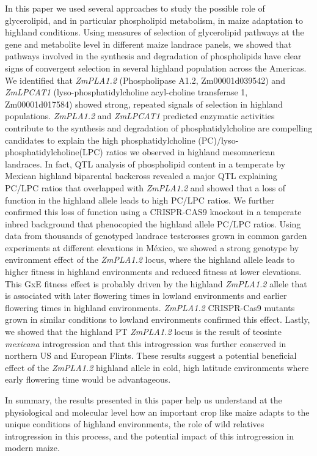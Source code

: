 \documentclass[9pt,twocolumn,twoside]{BioRxiv}
\begin{document}
In this paper we used several approaches to study the possible role of glycerolipid, and in particular phospholipid metabolism, in maize adaptation to highland conditions. 
Using measures of selection of glycerolipid pathways at the gene and metabolite level in different maize landrace panels, we showed that pathways involved in the synthesis and degradation of phospholipids have clear signs of convergent selection in several highland population across the Americas. 
We identified that \textit{ZmPLA1.2} (Phospholipase A1.2, Zm00001d039542) and \textit{ZmLPCAT1} (lyso-phosphatidylcholine acyl-choline transferase 1, Zm00001d017584) showed strong, repeated signals of selection in highland populations. 
\textit{ZmPLA1.2} and \textit{ZmLPCAT1} predicted enzymatic activities contribute to the synthesis and degradation of phosphatidylcholine are compelling candidates to explain the high phosphatidylcholine (PC)/lyso-phosphatidylcholine(LPC) ratios we observed in highland mesomaerican landraces. 
In fact, QTL analysis of phospholipid content in a temperate by Mexican highland biparental backcross revealed a major QTL explaining PC/LPC ratios that overlapped with \textit{ZmPLA1.2} and showed that a loss of function in the highland allele leads to high PC/LPC ratios. 
We further confirmed this loss of function using a CRISPR-CAS9 knockout in a temperate inbred background that phenocopied the highland allele PC/LPC ratios. 
Using data from thousands of genotyped landrace testcrosses grown in common garden experiments at different elevations in México, we showed a strong genotype by environment effect of the \textit{ZmPLA1.2} locus, 
where the highland allele leads to higher fitness in highland environments and reduced fitness at lower elevations. 
This GxE fitness effect is probably driven by the highland \textit{ZmPLA1.2} allele that is associated with later flowering times in lowland environments and earlier flowering times in highland environments. 
\textit{ZmPLA1.2} CRISPR-Cas9 mutants grown in similar conditions to lowland environments confirmed this effect.
Lastly, we showed that the highland PT \textit{ZmPLA1.2} locus is the result of teosinte \textit{mexicana} introgression and that this introgression was further conserved in northern US and European Flints. 
These results suggest a potential beneficial effect of the \textit{ZmPLA1.2} highland allele in cold, high latitude environments where early flowering time would be advantageous.

In summary, the results presented in this paper help us understand at the physiological and molecular level how an important crop like maize adapts to the unique conditions of highland environments, the role of wild relatives introgression in this process, and the potential impact of this introgression in modern maize.
\end{document}

